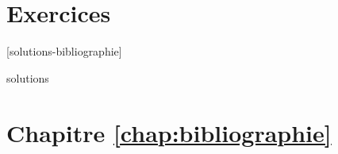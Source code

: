 
\section{Exercices}
\label{sec:bibliographie:exercices}

[solutions-bibliographie]

\begin{Filesave}{solutions}
\section*{Chapitre \ref*{chap:bibliographie}}

\end{Filesave}


